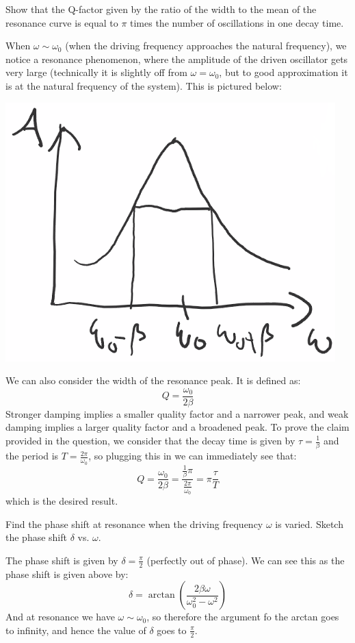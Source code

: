 \begin{p}
Show that the Q-factor given by the ratio of the width to the mean of the resonance curve is equal to $\pi$ times the number of oscillations in one decay time.
\end{p}
\begin{s}
When $\omega \sim \omega_0$ (when the driving frequency approaches the natural frequency), we notice a resonance phenomenon, where the amplitude of the driven oscillator gets very large (technically it is slightly off from $\omega = \omega_0$, but to good approximation it is at the natural frequency of the system). This is pictured below:
\begin{center}
    \includegraphics[scale=0.5]{Lecture-9/w9-img2.png}
\end{center}
We can also consider the width of the resonance peak. It is defined as:
\[Q = \frac{\omega_0}{2\beta}\]
Stronger damping implies a smaller quality factor and a narrower peak, and weak damping implies a larger quality factor and a broadened peak. To prove the claim provided in the question, we consider that the decay time is given by $\tau = \frac{1}{\beta}$ and the period is $T = \frac{2\pi}{\omega_0}$, so plugging this in we can immediately see that:
\[Q = \frac{\omega_0}{2\beta} = \frac{\frac{1}{\beta}\pi}{\frac{2\pi}{\omega_0}} = \pi\frac{\tau}{T}\]
which is the desired result.
\end{s}

\begin{p}
Find the phase shift at resonance when the driving frequency $\omega$ is varied. Sketch the phase shift $\delta$ vs. $\omega$.
\end{p}
\begin{s}
The phase shift is given by $\delta = \frac{\pi}{2}$ (perfectly out of phase). We can see this as the phase shift is given above by:
\[\delta = \arctan(\frac{2\beta\omega}{\omega_0^2 - \omega^2})\]
And at resonance we have $\omega \sim \omega_0$, so therefore the argument fo the arctan goes to infinity, and hence the value of $\delta$ goes to $\frac{\pi}{2}$.
\end{s}